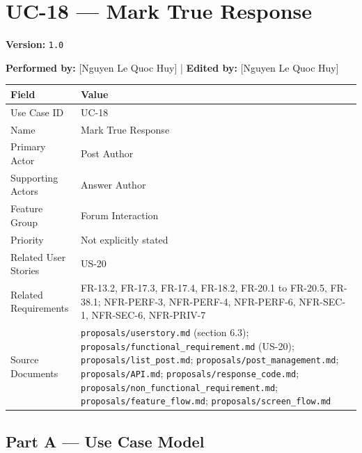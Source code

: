 \documentclass[12pt]{article}
\renewcommand{\baselinestretch}{1.5}
\begin{document}
\pagebreak
\hypertarget{sec:uc-18-mark-true-response}{}
\section*{UC-18 --- Mark True Response}
\par\medskip

\textbf{Version:} \texttt{1.0}
\par\medskip

\textbf{Performed by:} [Nguyen Le Quoc Huy] | \textbf{Edited by:} [Nguyen Le Quoc Huy]
\par\medskip

\begingroup
\small
\renewcommand{\baselinestretch}{1.0}\selectfont
\renewcommand{\arraystretch}{1.15}
\setlength{\tabcolsep}{6pt}
\begin{longtable}{|>{\raggedright\arraybackslash}p{}|>{\raggedright\arraybackslash}p{}|}
\hline
\textbf{Field} & \textbf{Value} \\ \hline
\endhead
Use Case ID & UC-18 \\ \hline
Name & Mark True Response \\ \hline
Primary Actor & Post Author \\ \hline
Supporting Actors & Answer Author \\ \hline
Feature Group & Forum Interaction \\ \hline
Priority & Not explicitly stated \\ \hline
Related User Stories & US-20 \\ \hline
Related Requirements & FR-13.2, FR-17.3, FR-17.4, FR-18.2, FR-20.1 to FR-20.5, FR-38.1; NFR-PERF-3, NFR-PERF-4, NFR-PERF-6, NFR-SEC-1, NFR-SEC-6, NFR-PRIV-7 \\ \hline
Source Documents & \texttt{proposals/userstory.md} (section 6.3); \texttt{proposals/functional\_requirement.md} (US-20); \texttt{proposals/list\_post.md}; \texttt{proposals/post\_management.md}; \texttt{proposals/API.md}; \texttt{proposals/response\_code.md}; \texttt{proposals/non\_functional\_requirement.md}; \texttt{proposals/feature\_flow.md}; \texttt{proposals/screen\_flow.md} \\ \hline
\end{longtable}
\endgroup
\par\medskip

\hypertarget{sec:part-a-use-case-model}{}
\subsection*{Part A --- Use Case Model}
\par\medskip
\end{document}
